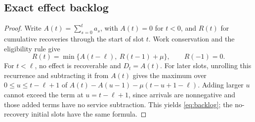 \subsection{Exact effect backlog}
\begin{proof}
Write $A(t)=\sum_{s=0}^t a_s$, with $A(t)=0$ for $t<0$, and $R(t)$ for cumulative recoveries through the start of slot $t$. Work conservation and the eligibility rule give
\[
 R(t)=\min\{A(t-\ell),\ R(t-1)+\mu\},\qquad R(-1)=0.
\]
For $t<\ell$, no effect is recoverable and $D_t=A(t)$. For later slots, unrolling this recurrence and subtracting it from $A(t)$ gives the maximum over $0\le u\le t-\ell+1$ of $A(t)-A(u-1)-\mu(t-u+1-\ell)$. Adding larger $u$ cannot exceed the term at $u=t-\ell+1$, since arrivals are nonnegative and those added terms have no service subtraction. This yields \cref{eq:backlog}; the no-recovery initial slots have the same formula.
\end{proof}

